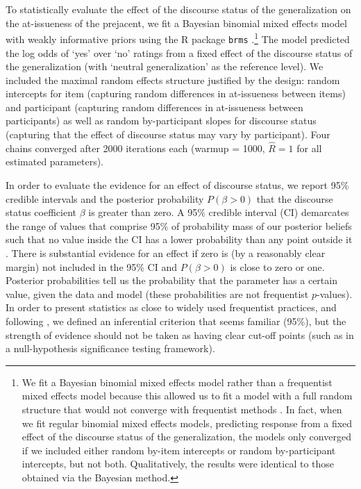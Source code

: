 \documentclass[11pt,fleqn]{article}
\newcommand{\6}{\mbox{$[\hspace*{-.6mm}[$}}
\newcommand{\9}{\mbox{$]\hspace*{-.6mm}]$}}
\begin{document}
To statistically evaluate the effect of the discourse status of the generalization on the at-issueness of the prejacent, we fit a Bayesian binomial mixed effects model with weakly informative priors using the R package \verb|brms| \citep{buerkner2017}.\footnote{We fit a Bayesian binomial mixed effects model rather than a frequentist mixed effects model because this allowed us to fit a model with a full random structure that would not converge with frequentist
methods \citep{Nicenboim2016}. In fact, when we fit regular binomial mixed effects models, predicting response from a fixed effect of the discourse status of the generalization, the models only converged if we included either random by-item intercepts or random by-participant intercepts, but not both. Qualitatively, the results were identical to those obtained via the Bayesian method.} The model predicted the log odds of `yes' over `no' ratings from a fixed effect of the discourse status of the generalization (with `neutral generalization' as the reference level). We included the maximal random effects structure justified by the design: random intercepts for item (capturing random differences in at-issueness between items) and participant (capturing random differences in at-issueness between participants) as well as random by-participant slopes for discourse status (capturing that the effect of discourse status may vary by participant). Four chains converged after 2000 iterations each (warmup = 1000, \(\hat{R}=1\) for all estimated parameters).

In order to evaluate the evidence for an effect of discourse status, we report 95\% credible intervals and the posterior probability $P(\beta > 0)$ that the discourse status coefficient $\beta$ is greater than zero. A 95\% credible interval (CI) demarcates the range of values that comprise 95\% of probability mass of our posterior beliefs such that no value inside the CI has a lower probability than any point outside it \citep{Jaynes1976, Morey2016}. There is substantial evidence for an effect if zero is (by a reasonably clear margin) not included in the 95\% CI and $P(\beta > 0)$ is close to zero or one. Posterior probabilities tell us the probability that the parameter has a certain value, given the data and model (these probabilities are not frequentist $p$-values). In order to present statistics as close to widely used frequentist practices, and following \citealt{Nicenboim2016}, we defined an inferential criterion that seems familiar (95\%), but the strength of evidence should not be taken as having clear cut-off points (such as in a null-hypothesis significance testing framework).
\end{document}
